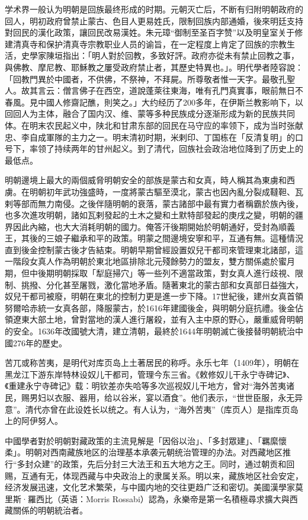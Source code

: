 学术界一般认为明朝是回族最终形成的时期。元朝灭亡后，不断有归附明朝政府的回人，明初政府曾禁止蒙古、色目人更易姓氏，限制回族内部通婚，後來明廷支持對回民的漢化政策，讓回民改易漢姓。朱元璋“御制至圣百字赞”以及明皇室关于修建清真寺和保护清真寺宗教职业人员的谕旨，在一定程度上肯定了回族的宗教生活，史學家陳垣指出：「明人對於回教，多致好評。政府亦從未有禁止回教之事，與佛教、摩尼教、耶穌教之屢受政府禁止者，其歷史特異也。」。明代學者陸容說：「回教門異於中國者，不供佛，不祭神，不拜屍。所尊敬者惟一天字。最敬孔聖人。故其言云：僧言佛子在西空，道說蓬萊往東海，唯有孔門真實事，眼前無日不春風。見中國人修齋記醮，則笑之。」大约经历了200多年，在伊斯兰教影响下，以回回人为主体，融合了国内汉、维、蒙等多种民族成分逐渐形成为新的民族共同体。在明末农民起义中，陕北和甘肃东部的回民在马守应的率领下，成为当时张献忠、李自成軍隊的主力之一。明末清初时期，米剌印、丁国栋在「反清复明」的口号下，率领了持续两年的甘州起义。到了清代，回族社会政治地位降到了历史上的最低点。

明朝邊境上最大的兩個威脅明朝安全的部族是蒙古和女真，時人稱其為東虜和西虜。在明朝初年武功強盛時，一度將蒙古驅至漠北，蒙古也因內亂分裂成韃靼、瓦剌等部而無力南侵。之後伴隨明朝的衰落，蒙古諸部中最有實力者稱霸於族內後，也多次進攻明朝，諸如瓦剌發起的土木之變和土默特部發起的庚戌之變，明朝的疆界因此內縮，也大大消耗明朝的國力。俺答汗後期開始於明朝通好，受封為順義王，其後的三娘子繼承和平的政策。明蒙之間邊境安寧和平，互通有無。這種情況直到後金控制蒙古後才告結束。明朝早期曾經設置奴兒干都司來管理東北諸部，這一階段女真人作為明朝於東北地區排除北元殘餘勢力的盟友，雙方關係處於蜜月期，但中後期明朝採取「犁庭掃穴」等一些列不適當政策，對女真人進行歧視、限制、挑撥、分化甚至屠戮，激化當地矛盾。隨著東北的蒙古部和女真部日益強大，奴兒干都司被廢，明朝在東北的控制力更是進一步下降。17世紀後，建州女真首領努爾哈赤統一女真各部，降服蒙古，於1616年建國後金，與明朝分庭抗禮。後金佔領遼東大部土地，曾對當地的漢人進行屠殺，並有入主中原的野心，嚴重威脅明朝的安全。1636年改國號大清，建立清朝，最終於1644年明朝滅亡後接替明朝統治中國276年的歷史。

苦兀或称苦夷，是明代对库页岛上土著居民的称呼。永乐七年（1409年），明朝在黑龙江下游东岸特林设奴儿干都司，管理今东三省。《敕修奴儿干永宁寺碑记》、《重建永宁寺碑记》载：明钦差亦失哈等多次巡视奴儿干地方，曾对“海外苦夷诸民，赐男妇以衣服、器用，给以谷米，宴以酒食”。他们表示，“世世臣服，永无异意”。清代亦曾在此设姓长以统之。有人认为，“海外苦夷”（库页人）是指库页岛上的阿伊努人。

中國學者對於明朝對藏政策的主流見解是「因俗以治」、「多封眾建」、「羈縻懷柔」。明朝对西南藏族地区的治理基本承袭元朝统治管理的办法。对西藏地区推行“多封众建”的政策，先后分封三大法王和五大地方之王。同时，通过朝贡和回赐，互通有无，体现西藏与中央政治上的隶属关系。明以来，藏族地区社会安定，经济发展迅速，文化艺术繁荣，与中國内地的交往更趋广泛和密切。美國漢學家莫里斯·羅西比（英语：Morris Rossabi）認為，永樂帝是第一名積極尋求擴大與西藏關係的明朝統治者。

